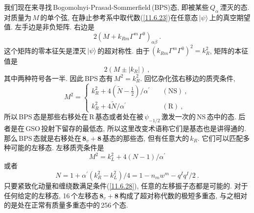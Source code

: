 我们现在来寻找\,Bogomolnyi-Prasad-Sommerfield\,(BPS)态, 即被某些$\,Q_{\alpha}\,$湮灭的态. 对质量为$\,M\,$的单个弦, 在静止参考系中取代数(\ref{11.6.23})在任意态$\,\lvert \psi\rangle\,$上的真空期望值. 左手边是非负矩阵. 右边是
\begin{equation}
    2(M+k_{Rm}\Gamma^{m}\Gamma^{0})_{\alpha\beta} \:. \label{11.6.24}
\end{equation}
这个矩阵的零本征矢是湮灭$\,\lvert\psi\rangle\,$的超对称性. 由于$\,(k_{Rm}\Gamma^{m}\Gamma^{0})^{2}=k_{R}^{2}$, 矩阵的本征值是
\begin{equation}
    2(M\pm\lvert k_{R}\rvert) \:, \label{11.6.25}
\end{equation}
其中两种符号各一半. 因此\,BPS\,态有$\,M^{2}=k_{R}^{2}$. 回忆杂化弦右移边的质壳条件,
\begin{equation}
    M^{2} = \begin{cases}
        k_{R}^{2}+4(\tilde{N}-\tfrac{1}{2})/\alpha^{\prime} & \quad(\text{NS})\:, \\
        k_{R}^{2}+4\tilde{N}/\alpha^{\prime} &\quad (\text{R})\:,
    \end{cases} \label{11.6.26}
\end{equation}
所以\,BPS\,态是那些右移处在\,R\,基态或者处在被$\,\psi_{-1/2}\,$激发一次的\,NS\,态中的态. 后者是在\,GSO\,投射下留存的最低态, 所以这里改变术语称它们是基态也是讲得通的. 那么\,BPS\,态就是右移处在$\,\mathbf{8}_{v}+\mathbf{8}\,$基态的那些态, 但有任意大的$\,k_{R}$. 它们可以匹配多种可能的左移态. 左移质壳条件是
\begin{equation}
    M^{2}=k_{L}^{2}+4(N-1)/\alpha^{\prime} \label{11.6.27}
\end{equation}
或者
\begin{equation}
    N=1+\alpha^{\prime}(k_{R}^{2}-k_{L}^{2})/4=1-n_{m}w^{m}-q^{I}q^{I}/2 \:. \label{11.6.28}
\end{equation}
只要紧致化动量和缠绕数满足条件(\ref{11.6.28}), 任意的左移振子态都是可能的. 对于任何给定的左移态, 16\,个左移态$\,\mathbf{8}_{v}+\mathbf{8}\,$构成了超对称代数的极短多重态, 与之相对的是处在正常有质量多重态中的\,256\,个态.


